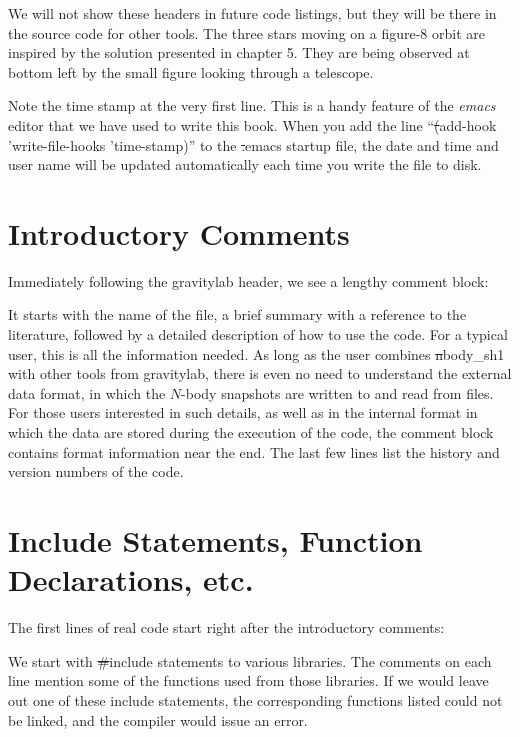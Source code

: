 
We will not show these headers in future code listings, but they will
be there in the source code for other tools.  The three stars moving
on a figure-8 orbit are inspired by the solution presented in chapter 5.
They are being observed at bottom left by the small figure looking
through a telescope.

Note the time stamp at the very first line.  This is a handy feature
of the {\it emacs} editor that we have used to write this book.  When
you add the line ``{\st (add-hook 'write-file-hooks 'time-stamp)}'' to
the {\st .emacs} startup file, the date and time and user name will be
updated automatically each time you write the file to disk.

\section{Introductory Comments}

Immediately following the gravitylab header, we see a lengthy comment
block:


It starts with the name of the file, a brief summary with a reference
to the literature, followed by a detailed description of how to use
the code.  For a typical user, this is all the information needed.  As
long as the user combines {\st nbody\_sh1} with other tools from
gravitylab, there is even no need to understand the external data
format, in which the $N$-body snapshots are written to and read from
files.  For those users interested in such details, as well as in the
internal format in which the data are stored during the execution of
the code, the comment block contains format information near the end.
The last few lines list the history and version numbers of the code.

\section{Include Statements, Function Declarations, etc.}

The first lines of real code start right after the introductory comments:


We start with {\st \#include} statements to various libraries.  The comments 
on each line mention some of the functions used from those libraries.
If we would leave out one of these include statements, the corresponding
functions listed could not be linked, and the compiler would issue an error.

